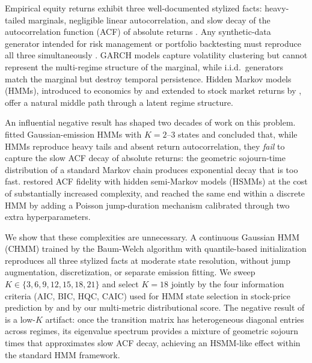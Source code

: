 Empirical equity returns exhibit three well-documented stylized facts: heavy-tailed marginals, negligible linear autocorrelation, and slow decay of the autocorrelation function (ACF) of absolute returns \cite{mandelbrot1963variation, cont2001empirical}.
Any synthetic-data generator intended for risk management or portfolio backtesting must reproduce all three simultaneously \cite{assefa2020generating, jordon2022synthetic}.
GARCH models \cite{engle1982autoregressive, bollerslev1986generalized} capture volatility clustering but cannot represent the multi-regime structure of the marginal, while i.i.d.\ generators match the marginal but destroy temporal persistence.
Hidden Markov models (HMMs), introduced to economics by \citet{hamilton1989new} and extended to stock market returns by \citet{schaller1997regime}, offer a natural middle path through a latent regime structure.

An influential negative result has shaped two decades of work on this problem.
\citet{ryden1998stylized} fitted Gaussian-emission HMMs with $K = 2$--$3$ states and concluded that, while HMMs reproduce heavy tails and absent return autocorrelation, they \emph{fail} to capture the slow ACF decay of absolute returns: the geometric sojourn-time distribution of a standard Markov chain produces exponential decay that is too fast.
\citet{bulla2006stylized} restored ACF fidelity with hidden semi-Markov models (HSMMs) at the cost of substantially increased complexity, and \citet{alswaidan2026hybrid} reached the same end within a discrete HMM by adding a Poisson jump-duration mechanism calibrated through two extra hyperparameters.

We show that these complexities are unnecessary.
A continuous Gaussian HMM (CHMM) trained by the Baum-Welch algorithm \cite{baum1970maximization, rabiner1986introduction} with quantile-based initialization reproduces all three stylized facts at moderate state resolution, without jump augmentation, discretization, or separate emission fitting.
We sweep $K \in \{3, 6, 9, 12, 15, 18, 21\}$ and select $K = 18$ jointly by the four information criteria (AIC, BIC, HQC, CAIC) used for HMM state selection in stock-price prediction by \citet{nguyen2018hidden} and by our multi-metric distributional score.
The negative result of \citet{ryden1998stylized} is a low-$K$ artifact: once the transition matrix has heterogeneous diagonal entries across regimes, its eigenvalue spectrum provides a mixture of geometric sojourn times that approximates slow ACF decay, achieving an HSMM-like effect within the standard HMM framework.


